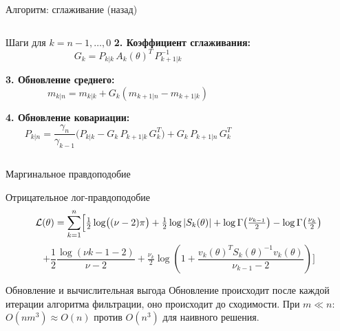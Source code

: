 \documentclass{beamer}
\begin{document}
\begin{frame}{Алгоритм: сглаживание (назад)}
\begin{columns}[T]
\begin{block}{\footnotesize Шаги для $k = n-1, \ldots, 0$}
        \textbf{2. Коэффициент сглаживания:}
        \vspace{-4pt}
        $$
            G_k = P_{k|k}\,A_k(\theta)^T\,P_{k+1|k}^{-1}
        $$

        \textbf{3. Обновление среднего:}
        \vspace{-4pt}
        $$
            m_{k|n} = m_{k|k} + G_k\!\left(m_{k+1|n} - m_{k+1|k}\right)
        $$

        \textbf{4. Обновление ковариации:}
        \vspace{-4pt}
        $$
            P_{k|n} = \frac{\gamma_n}{\gamma_{k-1}}
            \bigl(P_{k|k} - G_k\,P_{k+1|k}\,G_k^T\bigr)
            + G_k\,P_{k+1|n}\,G_k^T
        $$

    \end{block}

\end{columns}

\end{frame}


\begin{frame}{Маргинальное правдоподобие}
\footnotesize



\begin{block}{\footnotesize Отрицательное лог-правдоподобие}
$$
    \mathcal{L}(\theta) = \sum_{k=1}^{n} \Bigl[
        \tfrac{1}{2}\log\bigl((\nu-2)\pi\bigr)
        + \tfrac{1}{2}\log|S_k(\theta)|
        + \log\Gamma\!\left(\tfrac{\nu_{k-1}}{2}\right)
        - \log\Gamma\!\left(\tfrac{\nu_k}{2}\right)
$$
$$
        + {\frac{1}{2}\frac{\log(\nu{k-1}-2)}{\nu-2}} + \tfrac{\nu_k}{2}
        \log\!\left(
            1 + \frac{v_k(\theta)^T S_k(\theta)^{-1} v_k(\theta)}{\nu_{k-1}-2}
        \right)
    \Bigr]
$$
\end{block}

\begin{block}{Обновление и вычислительная выгода}
Обновление происходит после каждой итерации алгоритма фильтрации, оно происходит до сходимости. При $m \ll n$: $O(nm^3) \approx O(n)$ против $O(n^3)$ для наивного решения.\\
\end{block}


\end{frame}


\end{document}
